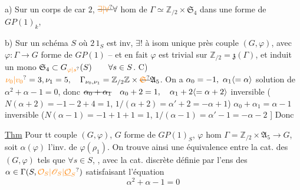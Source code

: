 a) Sur un corps de car $2$, $\deleted{\unsure{\exists|\forall}}\forall$ hom  de
$\Gamma\simeq\mathbb Z_{/2}\times\mathfrak S_4$ dans une forme de $GP(1)_k$,

b) Sur un schéma $S$ où $2\,1_S$ est inv,
$\exists!$ à isom unique près couple $(G,\varphi)$, avec
$\varphi:\Gamma\longrightarrow G$ forme de $GP(1)$  -- et en fait
$\varphi$ est trivial sur $\mathbb Z_{/2}=\mathfrak z(\Gamma)$, et induit un
mono $\mathfrak S_4\subset G_{\unsure{\varphi|s}}(S)\qquad\forall s\in S$.
C) $\unsure{\nu_0|v_0}=3,\nu_1=5,\quad\Gamma_{\nu_0,\nu_1}=\mathbb Z_{/2}\mathbb Z\times\deleted{\unsure{\mathfrak S}}\mathfrak A_5$. On a
$\alpha_0=-1,\ \alpha_1\inserted{=\alpha}$ solution de $\alpha^2+\alpha-1=0$, donc
$\deleted{\alpha_0+\alpha_1}\quad\alpha_0+2=1,\quad\alpha_1+2\inserted{=\alpha+2}$ inversible ($N(\alpha+2)=-1-2+4=1$,
$1/(\alpha+2)=\alpha'+2=-\alpha+1$) $\alpha_0+\alpha_1=\alpha-1$ inversible
($N(\alpha-1)=-1+1+1=1$, $1/(\alpha-1)=\alpha'-1=-\alpha-2$ ] Donc

\uline{Thm} Pour tt  couple $(G,\varphi)$, $G$ forme de
$GP(1)_S$, $\varphi$ hom $\Gamma=\mathbb Z_{/2}\times\mathfrak A_5\longrightarrow G$, soit
$\alpha(\varphi)$ l'inv. de $\varphi(\rho_1)$. On trouve ainsi une
équivalence entre la cat. des $(G,\varphi)$
tels que $\forall s\in S$, ,
avec la  cat. discrète 
définie par l'ens des $\alpha\in\Gamma(S,\unsure{\mathcal O_S|\mathscr O_S|\underline{\mathcal O}_S})$ satisfaisant
l'équation
\[\alpha^2+\alpha-1=0\]

